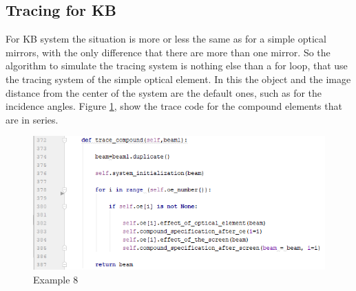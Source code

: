 \subsection{Tracing for KB}
For KB system the situation is more or less the same as for a simple optical mirrors, with the only difference that there are more than one mirror. So the algorithm to simulate the tracing system is nothing else than a for loop, that use the tracing system of the simple optical element. In this the object and the image distance from the center of the system are the default ones, such as for the incidence angles. Figure \ref{fig: CodeTraceCompund}, show the trace code for the compound elements that are in series.
\begin{figure}[H]
%
\centering
%
\includegraphics[width=1.\textwidth]{Immagini/Chapter3/CodeTraceCompound}
%
\caption{Example 8}
%
\label{fig: CodeTraceCompund}
%
\end{figure}

